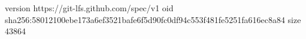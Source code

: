 version https://git-lfs.github.com/spec/v1
oid sha256:58012100ebe173a6ef3521bafe6f5d90fc0df94c553f481fe5251fa616ec8a84
size 43864
